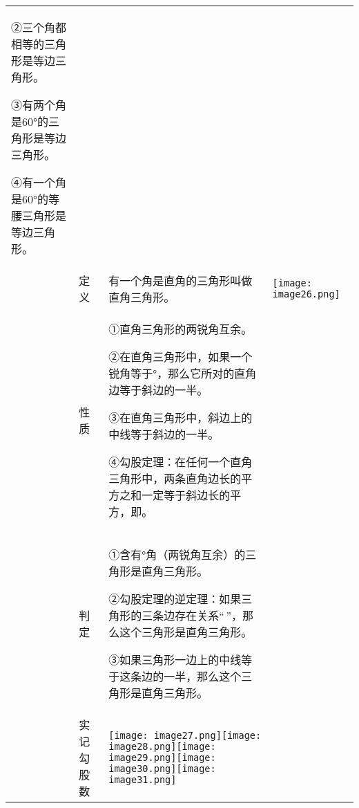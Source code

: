 \begin{longtable}[]{@{}llll@{}}
\begin{minipage}[t]{0.22\columnwidth}
②三个角都相等的三角形是等边三角形。

③有两个角是60°的三角形是等边三角形。

④有一个角是60°的等腰三角形是等边三角形。\strut
\end{minipage} & \begin{minipage}[t]{0.22\columnwidth}\raggedright
\strut
\end{minipage}\tabularnewline
& 定义 & 有一个角是直角的三角形叫做直角三角形。 &
\texttt{[image: image26.png]}\tabularnewline
\begin{minipage}[t]{0.22\columnwidth}\raggedright
\strut
\end{minipage} & \begin{minipage}[t]{0.22\columnwidth}\raggedright
性质\strut
\end{minipage} & \begin{minipage}[t]{0.22\columnwidth}\raggedright
①直角三角形的两锐角互余。

②在直角三角形中，如果一个锐角等于°，那么它所对的直角边等于斜边的一半。

③在直角三角形中，斜边上的中线等于斜边的一半。

④勾股定理：在任何一个直角三角形中，两条直角边长的平方之和一定等于斜边长的平方，即。\strut
\end{minipage} & \begin{minipage}[t]{0.22\columnwidth}\raggedright
\strut
\end{minipage}\tabularnewline
\begin{minipage}[t]{0.22\columnwidth}\raggedright
\strut
\end{minipage} & \begin{minipage}[t]{0.22\columnwidth}\raggedright
判定\strut
\end{minipage} & \begin{minipage}[t]{0.22\columnwidth}\raggedright
①含有°角（两锐角互余）的三角形是直角三角形。

②勾股定理的逆定理：如果三角形的三条边存在关系``\,''，那么这个三角形是直角三角形。

③如果三角形一边上的中线等于这条边的一半，那么这个三角形是直角三角形。\strut
\end{minipage} & \begin{minipage}[t]{0.22\columnwidth}\raggedright
\strut
\end{minipage}\tabularnewline
& 实记勾股数 &
\texttt{[image: image27.png]}\texttt{[image: image28.png]}\texttt{[image: image29.png]}\texttt{[image: image30.png]}\texttt{[image: image31.png]}
&\tabularnewline
\bottomrule
\end{longtable}

